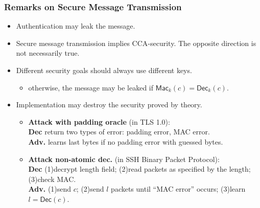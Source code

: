 \begin{frame}\frametitle{Remarks on Secure Message Transmission}
\begin{itemize}
\item Authentication may leak the message.
\item Secure message transmission implies CCA-security. The opposite direction is not necessarily true.
\item Different security goals should always use different keys.
\begin{itemize}
\item otherwise, the message may be leaked if $\mathsf{Mac}_k(c)=\mathsf{Dec}_k(c)$.
\end{itemize}
\item Implementation may destroy the security proved by theory.
\begin{itemize}
\item \textbf{Attack with padding oracle} (in TLS 1.0): \\
\textbf{Dec} return two types of error: padding error, MAC error. \\
\textbf{Adv.} learns last bytes if no padding error with guessed bytes. 
\item \textbf{Attack non-atomic dec.} (in SSH Binary Packet Protocol):\\
\textbf{Dec} (1)decrypt length field; (2)read packets as specified by the length; (3)check MAC. \\
\textbf{Adv.} (1)send $c$; (2)send $l$ packets until ``MAC error'' occurs; (3)learn $l = \mathsf{Dec}(c)$. 
\end{itemize}
\end{itemize}
\end{frame}
